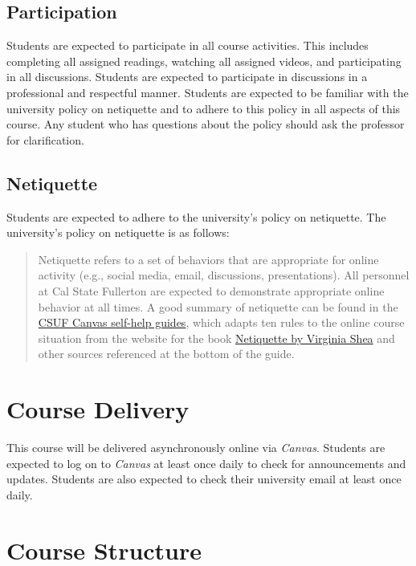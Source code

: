\documentclass[11pt, letterpaper]{article}
\begin{document}
\subsection*{Participation}

Students are expected to participate in all course activities. This includes completing all assigned readings, watching all assigned videos, and participating in all discussions. Students are expected to participate in discussions in a professional and respectful manner. Students are expected to be familiar with the university policy on netiquette and to adhere to this policy in all aspects of this course. Any student who has questions about the policy should ask the professor for clarification. 

\subsection*{Netiquette}
Students are expected to adhere to the university's policy on netiquette. The university's policy on netiquette is as follows:
\begin{quote}Netiquette refers to a set of behaviors that are appropriate for online activity (e.g., social media, email, discussions, presentations). All personnel at Cal State Fullerton are expected to demonstrate appropriate online behavior at all times. A good summary of netiquette can be found in the \href{https://canvashelp.fullerton.edu/m/Student/l/1336786-student-what-is-netiquette}{CSUF Canvas self-help guides}, which adapts ten rules to the online course situation from the website for the book \href{http://www.albion.com/netiquette/corerules.html}{Netiquette by Virginia Shea} and other sources referenced at the bottom of the guide.\end{quote}

\section{Course Delivery}

This course will be delivered asynchronously online via \emph{Canvas}. Students are expected to log on to \emph{Canvas} at least once daily to check for announcements and updates. Students are also expected to check their university email at least once daily.

\section{Course Structure}
\end{document}
